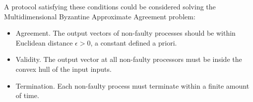 A protocol satisfying these conditions could be considered solving the Multidimensional Byzantine Approximate
Agreement problem:

\begin{itemize}
    \item Agreement. The output vectors of non-faulty processes should be within Euclidean distance $\epsilon > 0$, a constant defined a priori. 

    \item Validity. The output vector at all non-faulty processors must be inside the convex hull of the input inputs.

    \item Termination. Each non-faulty process must terminate within a finite amount of time.

\end{itemize}



